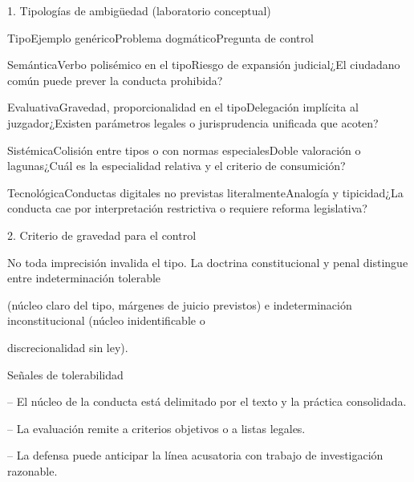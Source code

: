 \documentclass[11pt,a4paper]{article}
\begin{document}
      1. Tipologías de ambigüedad (laboratorio conceptual)\par



          TipoEjemplo genéricoProblema dogmáticoPregunta de control\par




          SemánticaVerbo polisémico en el tipoRiesgo de expansión judicial¿El ciudadano común puede prever la conducta prohibida?\par

          EvaluativaGravedad, proporcionalidad en el tipoDelegación implícita al juzgador¿Existen parámetros legales o jurisprudencia unificada que acoten?\par

          SistémicaColisión entre tipos o con normas especialesDoble valoración o lagunas¿Cuál es la especialidad relativa y el criterio de consumición?\par

          TecnológicaConductas digitales no previstas literalmenteAnalogía y tipicidad¿La conducta cae por interpretación restrictiva o requiere reforma legislativa?\par








      2. Criterio de gravedad para el control\par


        No toda imprecisión invalida el tipo. La doctrina constitucional y penal distingue entre indeterminación tolerable\par
        (núcleo claro del tipo, márgenes de juicio previstos) e indeterminación inconstitucional (núcleo inidentificable o\par
        discrecionalidad sin ley).\par




          Señales de tolerabilidad\par


-- El núcleo de la conducta está delimitado por el texto y la práctica consolidada.\par


-- La evaluación remite a criterios objetivos o a listas legales.\par


-- La defensa puede anticipar la línea acusatoria con trabajo de investigación razonable.\par
\end{document}
